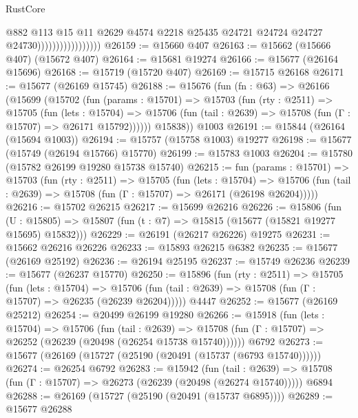 \begin{lexlean}{RustCore}
\begin{coremodule}
                                      @882
                                      @113
                                      @15
                                      @11
                                      @2629
                                      @4574
                                      @2218
                                      @25435
                                      @24721
                                      @24724
                                      @24727
                                      @24730)))))))))))))))))
@26159 := @15660 @407
@26163 := @15662 (@15666 @407) (@15672 @407)
@26164 := @15681 @19274
@26166 := @15677 (@26164 @15696)
@26168 := @15719 (@15720 @407)
@26169 := @15715 @26168
@26171 := @15677 (@26169 @15745)
@26188 := @15676
    (fun (fn : @63) =>
    @26166
      (@15699
        (@15702
          (fun (params : @15701) =>
          @15703
            (fun (rty : @2511) =>
            @15705
              (fun (lets : @15704) =>
              @15706 (fun (tail : @2639) => @15708 (fun (Γ : @15707) => @26171 @15792))))))
        @15838))
    @1003
@26191 := @15844 (@26164 (@15694 @1003))
@26194 := @15757 (@15758 @1003) @19277
@26198 := @15677 (@15749 (@26194 @15766) @15770)
@26199 := @15783 @1003
@26204 := @15780 (@15782 @26199 @19280 @15738 @15740)
@26215 := fun (params : @15701) =>
  @15703
    (fun (rty : @2511) =>
    @15705
      (fun (lets : @15704) =>
      @15706 (fun (tail : @2639) => @15708 (fun (Γ : @15707) => @26171 (@26198 @26204)))))
@26216 := @15702 @26215
@26217 := @15699 @26216
@26226 := @15806
    (fun (U : @15805) => @15807 (fun (t : @7) => @15815 (@15677 (@15821 @19277 @15695) @15832)))
@26229 := @26191 (@26217 @26226) @19275
@26231 := @15662 @26216 @26226
@26233 := @15893 @26215 @6382
@26235 := @15677 (@26169 @25192)
@26236 := @26194 @25195
@26237 := @15749 @26236
@26239 := @15677 (@26237 @15770)
@26250 := @15896
    (fun (rty : @2511) =>
    @15705
      (fun (lets : @15704) =>
      @15706 (fun (tail : @2639) => @15708 (fun (Γ : @15707) => @26235 (@26239 @26204)))))
    @4447
@26252 := @15677 (@26169 @25212)
@26254 := @20499 @26199 @19280
@26266 := @15918
    (fun (lets : @15704) =>
    @15706
      (fun (tail : @2639) =>
      @15708 (fun (Γ : @15707) => @26252 (@26239 (@20498 (@26254 @15738 @15740))))))
    @6792
@26273 := @15677 (@26169 (@15727 (@25190 (@20491 (@15737 (@6793 @15740))))))
@26274 := @26254 @6792
@26283 := @15942
    (fun (tail : @2639) => @15708 (fun (Γ : @15707) => @26273 (@26239 (@20498 (@26274 @15740)))))
    @6894
@26288 := @26169 (@15727 (@25190 (@20491 (@15737 @6895))))
@26289 := @15677 @26288

\end{coremodule}
\end{lexlean}
